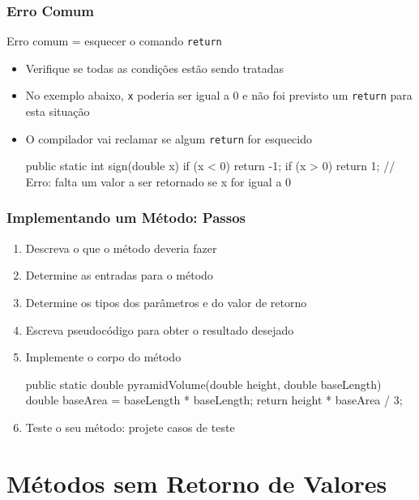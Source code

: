 \documentclass[xcolor={dvipsnames,table},aspectratio=169]{beamer}
\begin{document}
\begin{frame}[fragile]\frametitle{Erro Comum}
Erro comum = esquecer o comando \texttt{return}
\begin{itemize}
	\item Verifique se todas as condições estão sendo tratadas
	\item No exemplo abaixo, \texttt{x} poderia ser igual a 0 e não foi previsto um \texttt{return} para esta situação
	\item O compilador vai reclamar se algum \texttt{return} for esquecido
\begin{javacode}
public static int sign(double x) {
  if (x < 0) { return -1; }
  if (x > 0) { return 1; }
  // Erro: falta um valor a ser retornado se x for igual a 0
}
\end{javacode}
\end{itemize}
\end{frame}

\begin{frame}[fragile]\frametitle{Implementando um Método: Passos}
\begin{enumerate}
	\item Descreva o que o método deveria fazer
	\item Determine as entradas para o método
	\item Determine os tipos dos parâmetros e do valor de retorno
	\item Escreva pseudocódigo para obter o resultado desejado
	\item Implemente o corpo do método
\begin{javacode}
public static double pyramidVolume(double height, double baseLength) {
  double baseArea = baseLength * baseLength;
  return height * baseArea / 3;
}
\end{javacode}
	\item Teste o seu método: projete casos de teste
\end{enumerate}
\end{frame}

\section{Métodos sem Retorno de Valores}
\end{document}
